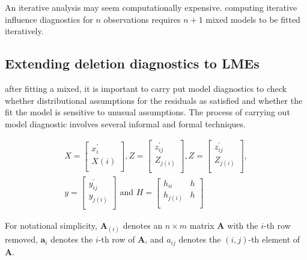 \documentclass[12pt, a4paper]{report}
\theoremstyle{plain}
\theoremstyle{definition}
\theoremstyle{remark}
\begin{document}
	
	An iterative analysis may seem computationally expensive.
	computing iterative influence diagnostics for $n$ observations
	requires $n+1$ mixed models to be fitted iteratively.
	
	
	\subsection{Extending deletion diagnostics to LMEs}
	after fitting a mixed, it is important to carry put model
	diagnostics to check whether distributional assumptions for the
	residuals as satisfied and whether the fit the model is sensitive
	to unusual assumptions. The process of carrying out model
	diagnostic involves several informal and formal techniques.
	
	
	\begin{eqnarray*}
		X= \left[%
		\begin{array}{c}
			x^\prime_{i} \\
			X(i) \\
		\end{array}%
		\right],
		Z= \left[%
		\begin{array}{c}
			z^\prime_{ij} \\
			Z_{j(i)} \\
		\end{array}%
		\right] ,
		Z = \left[%
		\begin{array}{c}
			z^\prime_{ij} \\
			Z_{j(i)} \\
		\end{array}%
		\right], \\
		y = \left[%
		\begin{array}{c}
			y^\prime_{ij} \\
			y_{j(i)} \\
		\end{array}%
		\right]
		\mbox{ and } H = \left[%
		\begin{array}{cc}
			h_{ii}& h\\
			h_{j(i)} & h\\
		\end{array}%
		\right]
	\end{eqnarray*}
	
	For notational simplicity, $\boldsymbol{A}_{(i)}$ denotes an $n
	\times m$ matrix  $\boldsymbol{A}$ with the $i$-th row removed,
	$\boldsymbol{a}_{i}$ denotes the $i$-th row of $\boldsymbol{A}$,
	and $a_{ij}$ denotes the $(i, j)$-th element of $\boldsymbol{A}$.
	
\end{document}
